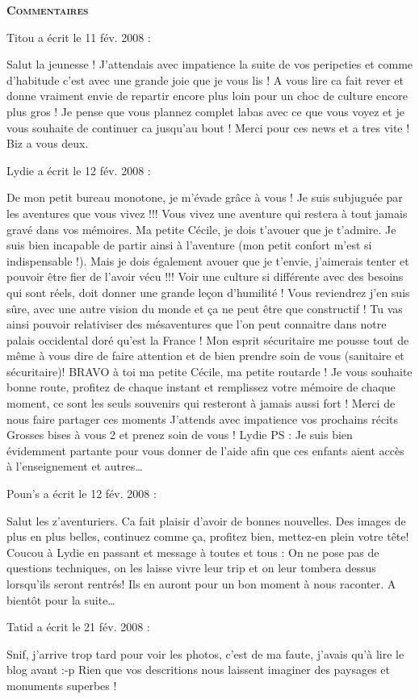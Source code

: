 \bigskip
\textbf{\textsc{Commentaires}}

\medskip
Titou a écrit le 11 fév. 2008 :
\begin{displayquote}
Salut la jeunesse ! J'attendais avec impatience la suite de vos peripeties et comme d'habitude c'est avec une grande joie que je vous lis ! A vous lire ca fait rever et donne vraiment envie de repartir encore plus loin pour un choc de culture encore plus gros ! Je pense que vous plannez complet labas avec ce que vous voyez et je vous souhaite de continuer ca jusqu'au bout ! Merci pour ces news et a tres vite ! Biz a vous deux.
\end{displayquote}

\medskip
Lydie a écrit le 12 fév. 2008 :
\begin{displayquote}
De mon petit bureau monotone, je m'évade grâce à vous !
Je suis subjuguée par les aventures que vous vivez !!!
Vous vivez une aventure qui restera à tout jamais gravé dans vos mémoires.
Ma petite Cécile, je dois t'avouer que je t'admire. Je suis bien incapable de partir ainsi à l'aventure (mon petit confort m'est si indispensable !).
Mais je dois également avouer que je t'envie, j'aimerais tenter et pouvoir être fier de l'avoir vécu !!!
Voir une culture si différente avec des besoins qui sont réels, doit donner une grande leçon d'humilité !
Vous reviendrez j'en suis sûre, avec une autre vision du monde et ça ne peut être que constructif !
Tu vas ainsi pouvoir relativiser des mésaventures que l'on peut connaitre dans notre palais occidental doré qu'est la France !
Mon esprit sécuritaire me pousse tout de même à vous dire de faire attention et de bien prendre soin de vous (sanitaire et sécuritaire)!
BRAVO à toi ma petite Cécile, ma petite routarde !
Je vous souhaite bonne route, profitez de chaque instant et remplissez votre mémoire de chaque moment, ce sont les seuls souvenirs qui resteront à jamais aussi fort !
Merci de nous faire partager ces moments
J'attends avec impatience vos prochains récits
Grosses bises à vous 2 et prenez soin de vous !
Lydie
PS : Je suis bien évidemment partante pour vous donner de l'aide afin que ces enfants aient accès à l'enseignement et autres\dots
\end{displayquote}

\medskip
Poun's a écrit le 12 fév. 2008 :
\begin{displayquote}
Salut les z'aventuriers. Ca fait plaisir d'avoir de bonnes nouvelles. Des images de plus en plus belles, continuez comme ça, profitez bien, mettez-en plein votre tête!
Coucou à Lydie en passant et message à toutes et tous :
On ne pose pas de questions techniques, on les laisse vivre leur trip et on leur tombera dessus lorsqu'ils seront rentrés! Ils en auront pour un bon moment à nous raconter.
A bientôt pour la suite\dots
\end{displayquote}

\medskip
Tatid a écrit le 21 fév. 2008 :
\begin{displayquote}
Snif, j'arrive trop tard pour voir les photos, c'est de ma faute, j'avais qu'à lire le blog avant :-p
Rien que vos descritions nous laissent imaginer des paysages et monuments superbes !
\end{displayquote}

\vfill
